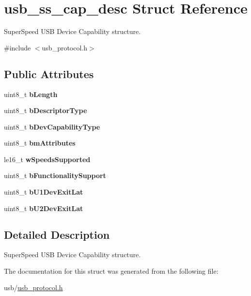 \hypertarget{structusb__ss__cap__desc}{}\section{usb\+\_\+ss\+\_\+cap\+\_\+desc Struct Reference}
\label{structusb__ss__cap__desc}


Super\+Speed U\+SB Device Capability structure.  




{\ttfamily \#include $<$usb\+\_\+protocol.\+h$>$}

\subsection*{Public Attributes}
\begin{DoxyCompactItemize}
\item 
\mbox{\label{structusb__ss__cap__desc_ac4b4e6e68c3cb02d325b0a4b9fab4414}} 
uint8\+\_\+t {\bfseries b\+Length}
\item 
\mbox{\label{structusb__ss__cap__desc_af4066e154a3524f8c06371a5a14b4646}} 
uint8\+\_\+t {\bfseries b\+Descriptor\+Type}
\item 
\mbox{\label{structusb__ss__cap__desc_add336af86582f586bb23beb58c98ee44}} 
uint8\+\_\+t {\bfseries b\+Dev\+Capability\+Type}
\item 
\mbox{\label{structusb__ss__cap__desc_a5c4a197f7b9bfc1b3eb714f325b95917}} 
uint8\+\_\+t {\bfseries bm\+Attributes}
\item 
\mbox{\label{structusb__ss__cap__desc_a7202bf6c7e7486fd924f4cf110004d9c}} 
le16\+\_\+t {\bfseries w\+Speeds\+Supported}
\item 
\mbox{\label{structusb__ss__cap__desc_ab75ab639aab6e33f85fbc69f191d2c74}} 
uint8\+\_\+t {\bfseries b\+Functionality\+Support}
\item 
\mbox{\label{structusb__ss__cap__desc_a8ac2297bd0bdd6c8252f1a4d587a5c1f}} 
uint8\+\_\+t {\bfseries b\+U1\+Dev\+Exit\+Lat}
\item 
\mbox{\label{structusb__ss__cap__desc_aafe3f255945721a763146dd075520b3d}} 
uint8\+\_\+t {\bfseries b\+U2\+Dev\+Exit\+Lat}
\end{DoxyCompactItemize}


\subsection{Detailed Description}
Super\+Speed U\+SB Device Capability structure. 

The documentation for this struct was generated from the following file\+:\begin{DoxyCompactItemize}
\item 
usb/\hyperlink{usb__protocol_8h}{usb\+\_\+protocol.\+h}\end{DoxyCompactItemize}
